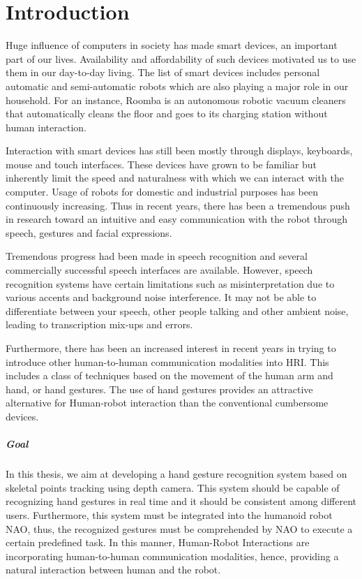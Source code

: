 \chapter{Introduction}
Huge influence of computers in society has made smart devices, an important part of our lives. Availability and affordability of such devices motivated us to use them in our day-to-day living. The list of smart devices includes personal automatic and semi-automatic robots which are also playing a major role in our household. For an instance, Roomba \cite{4} is an autonomous robotic vacuum cleaners that automatically cleans the floor and goes to its charging station without human interaction.

Interaction with smart devices has still been mostly through displays, keyboards, mouse and touch interfaces. These devices have grown to be familiar but inherently limit the speed and naturalness with which we can interact with the computer.  Usage of robots for domestic and industrial purposes has been continuously increasing. Thus in recent years, there has been a tremendous push in research toward an intuitive and easy communication with the robot through speech, gestures and facial expressions.

Tremendous progress had been made in speech recognition and several commercially successful speech interfaces are available. However, speech recognition systems have certain limitations such as misinterpretation due to various accents and background noise interference. It may not be able to differentiate between your speech, other people talking and other ambient noise, leading to transcription mix-ups and errors.

Furthermore, there has been an increased interest in recent years in trying to introduce other human-to-human communication modalities into HRI. This includes a class of techniques based on the movement of the human arm and hand, or hand gestures. The use of hand gestures provides an attractive alternative for Human-robot interaction than the conventional cumbersome devices.

\paragraph*{Goal} In this thesis, we aim at developing a hand gesture recognition system based on skeletal points tracking using depth camera. This system should be capable of recognizing hand gestures in real time and it should be consistent among different users. Furthermore, this system must be integrated into the humanoid robot NAO, thus, the recognized gestures must be comprehended by NAO to execute a certain predefined task. In this manner, Human-Robot Interactions are incorporating human-to-human communication modalities, hence, providing a natural interaction between human and the robot.


